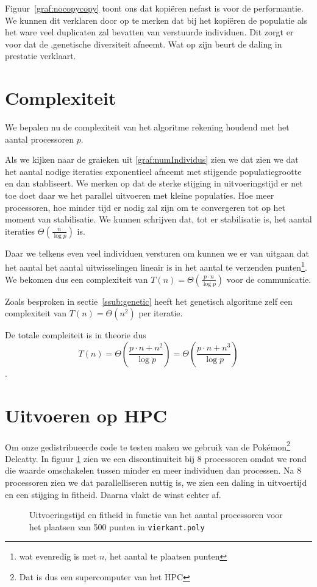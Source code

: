Figuur~\ref{graf:nocopycopy} toont ons dat kopiëren nefast is voor de performantie.
We kunnen dit verklaren door op te merken dat bij het kopiëren de populatie als het ware veel duplicaten zal bevatten van verstuurde individuen. Dit zorgt er voor dat de ,genetische diversiteit afneemt. Wat op zijn beurt de daling in prestatie verklaart. 
\section{Complexiteit}
We bepalen nu de complexiteit van het algoritme rekening houdend met het aantal processoren $p$.


Als we kijken naar de graieken uit \ref{graf:numIndividus} zien we dat zien we dat het aantal nodige iteraties exponentieel afneemt met stijgende populatiegrootte en dan stabliseert. We merken op dat de sterke stijging in uitvoeringstijd er net toe doet daar we het parallel uitvoeren met kleine populaties. Hoe meer processoren, hoe minder tijd er nodig zal zijn om te convergeren tot op het moment van stabilisatie. We kunnen schrijven dat, tot er stabilisatie is, het aantal iteraties $\Theta\left(\frac{n}{\log{p}}\right)$ is.

Daar we telkens even veel individuen versturen om kunnen we er van uitgaan dat het aantal het aantal uitwisselingen lineair is in het aantal te verzenden punten\footnote{wat evenredig is met $n$, het aantal te plaatsen punten}. We bekomen dus een complexiteit van $T(n)=\Theta\left(\frac{p\cdot n}{\log{p}}\right)$ voor de communicatie. 


Zoals besproken in sectie~\ref{ssub:genetic} heeft het genetisch algoritme zelf een complexiteit van $T(n)=\Theta(n^2)$ per iteratie. 

De totale compleiteit is in theorie dus  \[T(n)=\Theta\left(\frac{p\cdot n + n^2}{\log{p}}\right) = \Theta\left(\frac{p\cdot n + n^3}{\log{p}}\right)\]. 


\section{Uitvoeren op HPC}
Om onze gedistribueerde code te testen maken we gebruik van de Pokémon\footnote{Dat is dus een supercomputer van het HPC} Delcatty. In figuur \ref{delcaty} zien we een discontinuiteit bij 8 processoren omdat we rond die waarde omschakelen tussen minder en meer individuen dan processen. Na 8 processoren zien we dat parallelliseren nuttig is, we zien een daling in uitvoertijd en een stijging in fitheid. Daarna vlakt de winst echter af. 
\begin{figure}[H]

\caption{Uitvoeringstijd en fitheid in functie van het aantal processoren voor het plaatsen van 500 punten in \texttt{vierkant.poly}}
\label{delcaty}
\end{figure}



